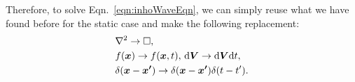 \documentclass[12pt,english]{article}
\newcommand{\dmr}[1]{\, \mathrm{d}#1} %
\renewcommand{\vec}[1]{\boldsymbol{#1}}
\begin{document}
Therefore, to solve Eqn.~\ref{eqn:inhoWaveEqn}, we can simply reuse what we have found before for the static case and make the following replacement:
\begin{subequations}
    \begin{align}
        &\laplacian \to \square, \\
        &f(\vec{x}) \to f(\vec{x}, t),\dmr{\vec{V}} \to \mathrm{d}\vec{V}\mathrm{d}t,\\
        &\delta(\vec{x}-\vec{x'}) \to \delta(\vec{x}-\vec{x'})\delta(t-t').
    \end{align}
\end{subequations}
\end{document}
